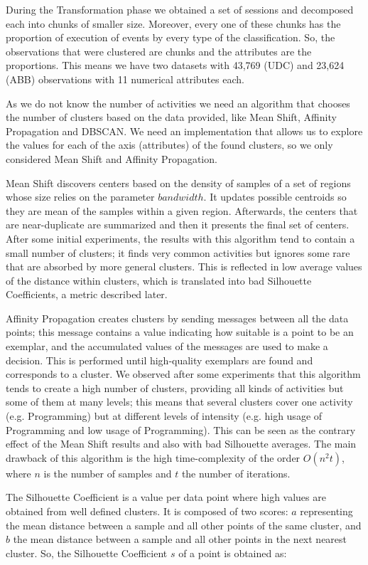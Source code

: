 \documentclass[conference]{IEEEtran}
\begin{document}
During the Transformation phase we obtained a set of sessions and decomposed each into chunks of smaller size. Moreover, every one of these chunks has the proportion of execution of events by every type of the classification. So, the observations that were clustered are chunks and the attributes are the proportions. This means we have two datasets with 43,769 (UDC) and 23,624 (ABB) observations with 11 numerical attributes each.

As we do not know the number of activities we need an algorithm that chooses the number of clusters based on the data provided, like Mean Shift, Affinity Propagation and DBSCAN. We need an implementation that allows us to explore the values for each of the axis (attributes) of the found clusters, so we only considered Mean Shift and Affinity Propagation.

Mean Shift \cite{CM02} discovers centers based on the density of samples of a set of regions whose size relies on the parameter $bandwidth$. It updates possible centroids so they are mean of the samples within a given region. Afterwards, the centers that are near-duplicate are summarized and then it presents the final set of centers. After some initial experiments, the results with this algorithm tend to contain a small number of clusters; it finds very common activities but ignores some rare that are absorbed by more general clusters. This is reflected in low average values of the distance within clusters, which is translated into bad Silhouette Coefficients, a metric described later.

Affinity Propagation \cite{FD07} creates clusters by sending messages between all the data points; this message contains a value indicating how suitable is a point to be an exemplar, and the accumulated values of the messages are used to make a decision. This is performed until high-quality exemplars are found and corresponds to a cluster. We observed after some experiments that this algorithm tends to create a high number of clusters, providing all kinds of activities but some of them at many levels; this means that several clusters cover one activity (e.g. Programming) but at different levels of intensity (e.g. high usage of Programming and low usage of Programming). This can be seen as the contrary effect of the Mean Shift results and also with bad Silhouette averages. The main drawback of this algorithm is the high time-complexity of the order $O(n^2t)$, where $n$ is the number of samples and $t$ the number of iterations.

The Silhouette Coefficient \cite{R87} is a value per data point where high values are obtained from well defined clusters. It is composed of two scores: $a$ representing the mean distance between a sample and all other points of the same cluster, and $b$ the mean distance between a sample and all other points in the next nearest cluster. So, the Silhouette Coefficient $s$ of a point is obtained as:
\end{document}
